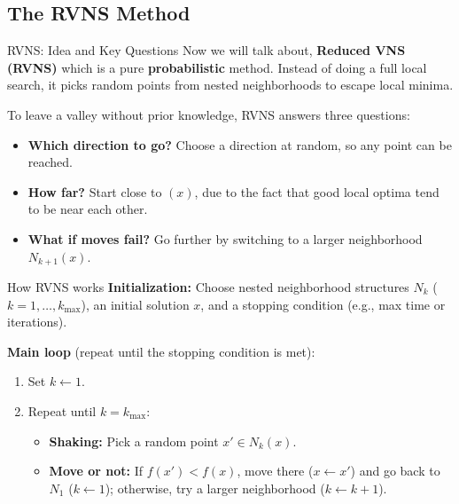 \documentclass{beamer}
\begin{document}
\subsection{The RVNS Method}
\begin{frame}{RVNS: Idea and Key Questions}
\quad Now we will talk about, \textbf{Reduced VNS (RVNS)} which is a pure \textbf{probabilistic} method. Instead of doing a full local search, it picks random points from nested neighborhoods to escape local minima.

\vspace{0.3cm}
To leave a valley without prior knowledge, RVNS answers three questions:
\begin{itemize}
\item \textbf{Which direction to go?} Choose a direction at random, so any point can be reached.
\vspace{0.15cm}
\item \textbf{How far?} Start close to $(x)$, due to the fact that good local optima tend to be near each other.
\vspace{0.15cm}
\item \textbf{What if moves fail?} Go further by switching to a larger neighborhood $N_{k+1}(x)$.
\end{itemize}
\end{frame}

\begin{frame}{How RVNS works}
\textbf{Initialization:} Choose nested neighborhood structures $N_k$ ($k = 1, \dots, k_{\max}$), an initial solution $x$, and a stopping condition (e.g., max time or iterations).

\vspace{0.2cm}
\textbf{Main loop} (repeat until the stopping condition is met):
\begin{enumerate}
\item Set $k \leftarrow 1$.
\item Repeat until $k = k_{\max}$:
    \begin{itemize}
    \item \textbf{Shaking:} Pick a random point $x' \in N_k(x)$.
    \item \textbf{Move or not:} If $f(x') < f(x)$, move there ($x \leftarrow x'$) and go back to $N_1$ ($k \leftarrow 1$); otherwise, try a larger neighborhood ($k \leftarrow k + 1$).
    \end{itemize}
\end{enumerate}
\end{frame}
\end{document}
